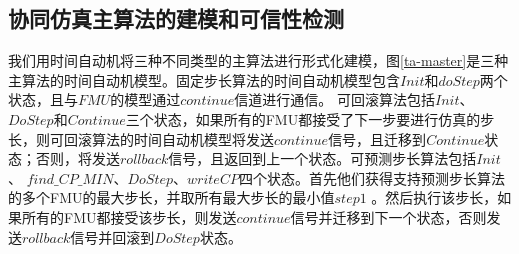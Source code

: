 \subsection{协同仿真主算法的建模和可信性检测} 
\label{sec:ma}
我们用时间自动机将三种不同类型的主算法进行形式化建模，图\ref{ta-master}是三种主算法的时间自动机模型。固定步长算法的时间自动机模型包含$Init$和$doStep$两个状态，且与$FMU$的模型通过$continue$信道进行通信。 可回滚算法包括$Init$、$DoStep$和$Continue$三个状态，如果所有的FMU都接受了下一步要进行仿真的步长，则可回滚算法的时间自动机模型将发送$continue$信号，且迁移到$Continue$状态；否则，将发送$rollback$信号，且返回到上一个状态。可预测步长算法包括$Init$、 $find \_ CP \_ MIN$、$DoStep$、$writeCP$四个状态。首先他们获得支持预测步长算法的多个FMU的最大步长，并取所有最大步长的最小值$step1$ 。然后执行该步长，如果所有的FMU都接受该步长，则发送$continue$信号并迁移到下一个状态，否则发送$rollback$信号并回滚到$DoStep$状态。
\begin{figure}[htbp]
\end{figure}

